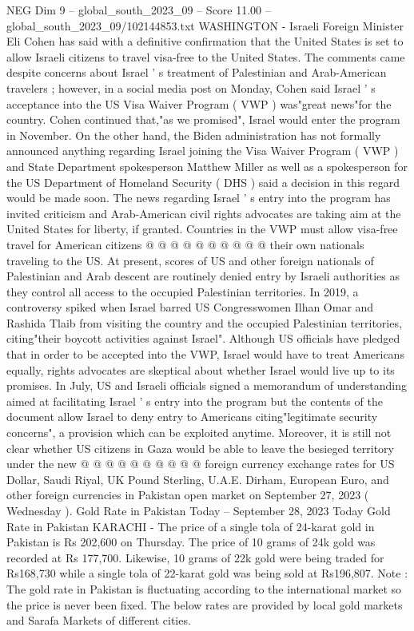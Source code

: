 \begin{textsample}{NEG Dim 9 – global\_south\_2023\_09 – Score 11.00 – global\_south\_2023\_09/102144853.txt}  \label{ex:f9_neg_443}
WASHINGTON - Israeli Foreign Minister Eli Cohen has said with a definitive confirmation that the United States is set to allow Israeli citizens to travel visa-free to the United States.
The comments came despite concerns about Israel ' s treatment of Palestinian and Arab-American travelers ; however, in a social media post on Monday, Cohen said Israel ' s acceptance into the US Visa Waiver Program ( VWP ) was"great news"for the country.
Cohen continued that,"as we promised", Israel would enter the program in November.
On the other hand, the Biden administration has not formally announced anything regarding Israel joining the Visa Waiver Program ( VWP ) and State Department spokesperson Matthew Miller as well as a spokesperson for the US Department of Homeland Security ( DHS ) said a decision in this regard would be made soon.
The news regarding Israel ' s entry into the program has invited criticism and Arab-American civil rights advocates are taking aim at the United States for liberty, if granted.
Countries in the VWP must allow visa-free travel for American citizens @ @ @ @ @ @ @ @ @ @ their own nationals traveling to the US.
At present, scores of US and other foreign nationals of Palestinian and Arab descent are routinely denied entry by Israeli authorities as they control all access to the occupied Palestinian territories.
In 2019, a controversy spiked when Israel barred US Congresswomen Ilhan Omar and Rashida Tlaib from visiting the country and the occupied Palestinian territories, citing"their boycott activities against Israel".
Although US officials have pledged that in order to be accepted into the VWP, Israel would have to treat Americans equally, rights advocates are skeptical about whether Israel would live up to its promises.
In July, US and Israeli officials signed a memorandum of understanding aimed at facilitating Israel ' s entry into the program but the contents of the document allow Israel to deny entry to Americans citing"legitimate security concerns", a provision which can be exploited anytime.
Moreover, it is still not clear whether US citizens in Gaza would be able to leave the besieged territory under the new @ @ @ @ @ @ @ @ @ @ foreign currency exchange rates for US Dollar, Saudi Riyal, UK Pound Sterling, U.A.E.
Dirham, European Euro, and other foreign currencies in Pakistan open market on September 27, 2023 ( Wednesday ).
Gold Rate in Pakistan Today -- September 28, 2023 Today Gold Rate in Pakistan KARACHI - The price of a single tola of 24-karat gold in Pakistan is Rs 202,600 on Thursday.
The price of 10 grams of 24k gold was recorded at Rs 177,700.
Likewise, 10 grams of 22k gold were being traded for Rs168,730 while a single tola of 22-karat gold was being sold at Rs196,807.
Note : The gold rate in Pakistan is fluctuating according to the international market so the price is never been fixed.
The below rates are provided by local gold markets and Sarafa Markets of different cities.

\end{textsample}
